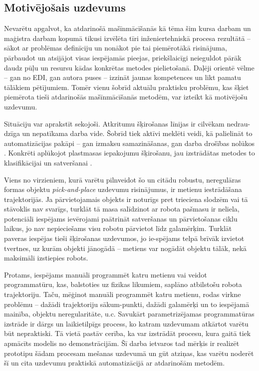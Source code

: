 \documentclass[12pt, a4paper]{article}
\numberwithin{equation}{section} %
\begin{document}
\subsection*{Motivējošais uzdevums} %

Nevarētu apgalvot, ka atdarinošā mašīnmācīšanās kā tēma šim kursa darbam un maģistra darbam kopumā tikusi izvēlēta tīri inženiertehniskā procesa rezultātā -- sākot ar problēmas definīciju un nonākot pie tai piemērotākā risinājuma, pārbaudot un atsijājot visas iespējamās pieejas, priekšlaicīgi neieguldot pārāk daudz pūļu un resursu kādas konkrētas metodes pielietošanā. Daļēji orientē vēlme -- gan no EDI, gan autora puses -- izzināt jaunas kompetences un likt pamatu tālākiem pētījumiem. Tomēr vienu šobrīd aktuālu praktisku problēmu, kas šķiet piemērota tieši atdarinošās mašīnmācīšanās metodēm, var izteikt kā motivējošu uzdevumu. 

Situāciju var aprakstīt sekojoši. Atkritumu šķirošanas līnijas ir cilvēkam nedrau-dzīga un nepatīkama darba vide. Šobrīd tiek aktīvi meklēti veidi, kā palielināt to automatizācijas pakāpi -- gan izmaksu samazināšanas, gan darba drošības nolūkos \cite{trashbot}. Konkrēti aplūkojot plastmasas iepakojumu šķirošanu, jau izstrādātas metodes to klasifikācijai un satveršanai \cite{trashbot}. 

Viens no virzieniem, kurā varētu pilnveidot šo un citādu robustu, neregulāras formas objektu \textit{pick-and-place} uzdevumu risinājumus, ir metienu iestrādāšana trajektorijās. Ja pārvietojamais objekts ir noturīgs pret trieciena slodzēm vai tā stāvoklis nav svarīgs, turklāt tā masa salīdzinot ar robota pašmasu ir neliela, potenciāli iespējams ievērojami paātrināt satveršanas un pārvietošanas ciklu laikus, jo nav nepieciešams visu robotu pārvietot līdz galamērķim. Turklāt paveras iespējas tieši šķirošanas uzdevumos, jo ie-spējams telpā brīvāk izvietot tvertnes, uz kurām objekti jānogādā -- metiens var nogādāt objektu tālāk, nekā maksimāli izstiepies robots. 

Protams, iespējams manuāli programmēt katru metienu vai veidot programmatūru, kas, balstoties uz fizikas likumiem, saplāno atbilstošu robota trajektoriju. Taču, mēģinot manuāli programmēt katru metienu, rodas virkne problēmu -- dažādi trajektoriju sākum-punkti, dažādi galamērķi un to iespējamā mainība, objektu neregularitāte, u.c. Savukārt parametrizējamas programmatūras izstrāde ir dārgs un laikietilpīgs process, ko katram uzdevumam atkārtot varētu būt nepraktiski. Tā vietā pastāv cerība, ka var izstrādāt procesu, kura gaitā tiek apmācīts modelis no demonstrācijām. Šī darba ietvaros tad mērķis ir realizēt prototipu šādam procesam mešanas uzdevumā un gūt atziņas, kas varētu noderēt šī un cita uzdevumu praktiskā automatizācijā ar atdarinošām metodēm.
\end{document}
